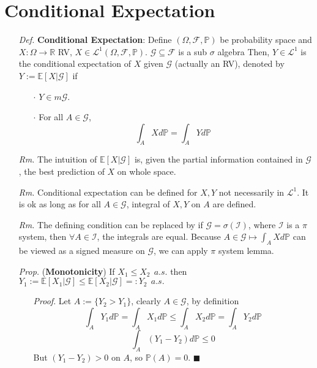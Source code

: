 \documentclass[a4paper,12pt,twoside]{book}
\begin{document}
\section{Conditional Expectation}
\begin{itemize}
	\item[\textit{Def.}] \textbf{Conditional Expectation}: Define $(\Omega, \mathcal{F}, \mathbb{P})$ be probability space and $X: \Omega \to \mathbb{R}$ RV, $X\in \mathcal{L}^1 (\Omega, \mathcal{F}, \mathbb{P})$. $\mathcal{G}\subseteq \mathcal{F}$ is a sub $\sigma$ algebra Then, $Y\in \mathcal{L}^1$ is the conditional expectation of $X$ given $\mathcal{G}$ (actually an RV), denoted by $Y:=\mathbb{E}\left[X|\mathcal{G} \right]$ if
	\begin{itemize}
		\item[$\cdot$] $Y \in m \mathcal{G}$.
		\item[$\cdot$] For all $A \in \mathcal{G}$,
		$$\int_{A} X d \mathbb{P} = \int_A Y d \mathbb{P}$$
	\end{itemize}

	\item[\textit{Rm.}] The intuition of $\mathbb{E}\left[X| \mathcal{G} \right]$ is, given the partial information contained in $\mathcal{G}$, the best prediction of $X$ on whole space.

	\item[\textit{Rm.}] Conditional expectation can be defined for $X, Y$ not necessarily in $\mathcal{L}^1$. It is ok as long as for all $A \in \mathcal{G}$, integral of $X, Y$ on $A$ are defined.

	\item[\textit{Rm.}] The defining condition can be replaced by if $\mathcal{G}=\sigma(\mathcal{I})$, where $\mathcal{I}$ is a $\pi$ system, then $\forall A \in \mathcal{I}$, the integrals are equal. Because $A\in \mathcal{G} \mapsto \int_A X d \mathbb{P}$ can be viewed as a signed measure on $\mathcal{G}$, we can apply $\pi$ system lemma.

	\item[\textit{Prop.}] (\textbf{Monotonicity}) If $X_1 \leq X_2~~a.s.$ then $Y_1:=\mathbb{E}\left[X_1|\mathcal{G} \right]\leq \mathbb{E}\left[X_2|\mathcal{G} \right]=:Y_2~~a.s.$
	\begin{itemize}
		\item[\textit{Proof}.] Let $A:=\{Y_2>Y_1\}$, clearly $A\in \mathcal{G}$, by definition
		\begin{equation}
			\int_A Y_1 d\mathbb{P}=\int_A X_1 d\mathbb{P}\leq \int_A X_2 d\mathbb{P} = \int_A Y_2 d\mathbb{P}
		\end{equation}
		\begin{equation}
			\int_A (Y_1-Y_2) d\mathbb{P} \leq0
		\end{equation}
		But $(Y_1 - Y_2)>0$ on $A$, so $\mathbb{P}\left(A\right)=0$. $\blacksquare$
	\end{itemize}


\end{itemize}
\end{document}
